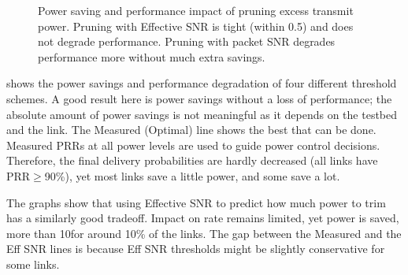 \begin{figure}[t]
      \centering
      \caption[Impact of pruning excess transmit power]{\label{fig:power_save_1x1} Power saving and performance impact of pruning excess transmit power. Pruning with Effective SNR is tight (within 0.5\dB) and does not degrade performance. Pruning with packet SNR degrades performance more without much extra savings.} 
\end{figure}


 shows the power savings and performance degradation of four different threshold schemes. A good result here is power savings without a loss of performance; the absolute amount of power savings is not meaningful as it depends on the testbed and the link. The Measured (Optimal) line shows the best that can be done. Measured PRRs at all power levels are used to guide power control decisions. Therefore, the final delivery probabilities are hardly decreased (all links have PRR$\geq$90\%), yet most links save a little power, and some save a lot.

The graphs show that using Effective SNR to predict how much power to trim has a similarly good tradeoff. Impact on rate remains limited, yet power is saved, more than 10\dB for around 10\% of the links. The gap between the Measured and the Eff SNR lines is because Eff SNR thresholds might be slightly conservative for some links.

